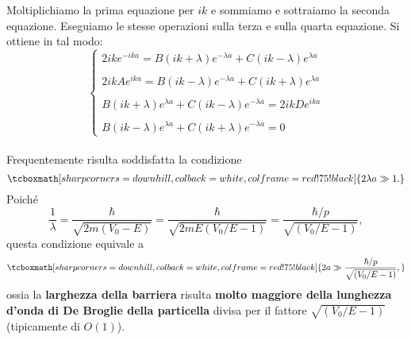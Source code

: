 Moltiplichiamo la prima equazione per $ik$ e sommiamo e sottraiamo la seconda equazione. Eseguiamo le stesse operazioni sulla terza e sulla quarta equazione. Si ottiene in tal modo:
	\begin{equation}
		\begin{cases}
		\displaystyle{2ike^{-ika}= B \left(ik+\lambda\right)e^{-\lambda a} +C \left(ik-\lambda\right)e^{\lambda a} }\\
		\\
		\displaystyle{2ikAe^{ika}= B \left(ik-\lambda\right)e^{-\lambda a} +C \left(ik+\lambda\right)e^{\lambda a} }\\
		\\
		\displaystyle{B\left(ik+\lambda\right)e^{\lambda a} + C\left(ik-\lambda\right)e^{-\lambda a} = 2ikD e^{ika}}\\
		\\
		\displaystyle{B\left(ik-\lambda\right)e^{\lambda a} + C\left(ik+\lambda\right)e^{-\lambda a} =0}
		\end{cases}
	\label{eq:cap10_10}
	\end{equation}\\

Frequentemente risulta soddisfatta la condizione
	\begin{equation}
		\tcboxmath[sharp corners=downhill, colback=white, colframe=red!75!black]{
			2\lambda a \gg 1.
			}
	\end{equation}
Poiché
	\begin{equation}
		\frac{1}{\lambda}=\frac{\hbar}{\sqrt{2m\left(V_0 - E \right)}}=\frac{\hbar}{\sqrt{2mE\left(V_0/E - 1 \right)}}=\frac{\hbar /p}{\sqrt{\left(V_0/E - 1 \right)}},
	\end{equation}
questa condizione equivale a
	\begin{equation}
		\tcboxmath[sharp corners=downhill, colback=white, colframe=red!75!black]{
			2a \gg \frac{\hbar /p}{\sqrt{\left(V_0/E - 1 \right)}},
			}
	\end{equation}
ossia la \textbf{larghezza della barriera} risulta \textbf{molto maggiore della lunghezza d'onda di De Broglie della particella} divisa per il fattore $\sqrt{\left(V_0/E - 1 \right)}$ (tipicamente di $O(1)$).\\

